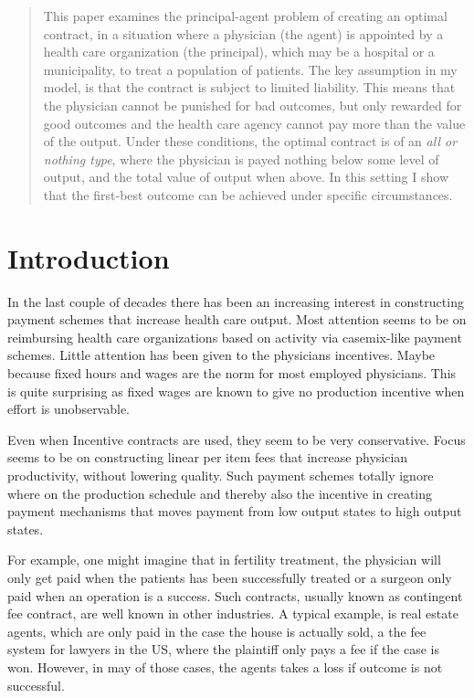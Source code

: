 


\maketitle
\begin{abstract}
This paper examines the principal-agent problem of creating an optimal contract, in a situation where a physician (the agent) is appointed by a health care organization (the principal), which may be a hospital or a municipality, to treat a population of patients. The key assumption in my model, is that the contract is subject to limited liability. This means that the physician cannot be punished for bad outcomes, but only rewarded for good outcomes and the health care agency cannot pay more than the value of the output. Under these conditions, the optimal contract is of an \emph{all or nothing type}, where the physician is payed nothing below some level of output,  and the total value of output when above. In this setting I show that the first-best outcome can be achieved under specific circumstances. 


\end{abstract}

\section{Introduction} %
\label{sec:introduction}
In the last couple of decades there has been an increasing interest in constructing payment schemes that increase health care output. Most attention seems to be on reimbursing health care organizations based on activity via casemix-like payment schemes. Little attention has been given to the physicians incentives. Maybe because fixed hours and wages are the norm for most employed physicians. This is quite surprising as fixed wages are known to give no production incentive when effort is unobservable.  

Even when Incentive contracts are used, they seem to be very conservative. Focus seems to be on constructing linear per item fees that increase physician productivity, without lowering quality. Such payment schemes totally ignore where on the production schedule and thereby also the incentive in creating payment mechanisms that moves payment from low output states to high output states. 

For example, one might imagine that in fertility treatment, the physician will only get paid when the patients has been successfully treated or a surgeon only paid when an operation is a success. Such contracts, usually known as contingent fee contract, are well known in other industries. A typical example, is real estate agents, which are only paid in the case the house is actually sold, a the fee system for lawyers in the US, where the plaintiff only pays a fee if the case is won. However, in may of those cases, the agents takes a loss if outcome is not successful.

